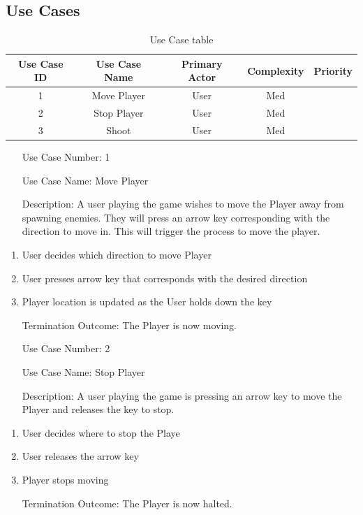\documentclass[10pt,conference,onecolumn,compsoc]{IEEEtran}
\begin{document}
\subsection{Use Cases}


\begin{table}
\centering
\begin{tabular}{|c|c|c|c|c|}
\hline
Use Case ID & Use Case Name & Primary Actor & Complexity & Priority \\
\hline 
1 & Move Player & User & Med & \\
\hline
2 & Stop Player & User & Med & \\
\hline 
3 & Shoot & User & Med & \\
\hline

\end{tabular}
\caption{Use Case table}
\label{tab:useCaseIndex}
\end{table}



\begin{itemize}
\item[Use Case Number:] 1
\item[Use Case Name:] Move Player
\item[Description:] A user playing the game wishes to move the Player away from spawning enemies. They will press an arrow key corresponding with the direction to move in. This will trigger the process to move the player. 
\end{itemize}

\begin{enumerate}
\item User decides which direction to move Player
\item User presses arrow key that corresponds with the desired direction
\item Player location is updated as the User holds down the key
\item[Termination Outcome:] The Player is now moving.
\end{enumerate}


\begin{itemize}
\item[Use Case Number:] 2
\item[Use Case Name:] Stop  Player
\item[Description:] A user playing the game is pressing an arrow key to move the Player and releases the key to stop.
\end{itemize}

\begin{enumerate}
\item User decides where to stop the Playe
\item User releases the arrow key
\item Player stops moving
\item[Termination Outcome:] The Player is now halted.
\end{enumerate}
\end{document}
